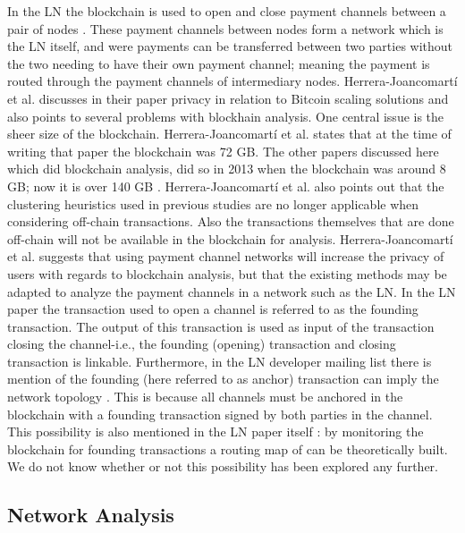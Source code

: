In the LN the blockchain is used to open and close payment channels between a pair of nodes \cite{poon2015bitcoin} \cite{malavolta2017concurrency}. These payment channels between nodes form a network which is the LN itself, and were payments can be transferred between two parties without the two needing to have their own payment channel; meaning the payment is routed through the payment channels of intermediary nodes.
Herrera-Joancomartí et al. discusses in their paper \cite{herrera2016privacy} privacy in relation to Bitcoin scaling solutions and also points to several problems with blockhain analysis. One central issue is the sheer size of the blockchain. Herrera-Joancomartí et al. states that at the time of writing that paper the blockchain was 72 GB. The other papers discussed here which did blockchain analysis, did so in 2013 when the blockchain was around 8 GB; now it is over 140 GB \cite{blockchain_size}. 
Herrera-Joancomartí et al. also points out that the clustering heuristics used in previous studies \cite{reid2013analysis}  \cite{meiklejohn2013fistful} are no longer applicable when considering off-chain transactions. Also the transactions themselves that are done off-chain will not be available in the blockchain for analysis. Herrera-Joancomartí et al. suggests that using payment channel networks will increase the privacy of users with regards to blockchain analysis, but that the existing methods may be adapted to analyze the payment channels in a network such as the LN. In the LN paper \cite{poon2015bitcoin} the transaction used to open a channel is referred to as the founding transaction. The output of this transaction is used as input of the transaction closing the channel-i.e., the founding (opening) transaction and closing transaction is linkable. Furthermore, in the LN developer mailing list there is mention of the founding (here referred to as anchor) transaction can imply the network topology \cite{rusty_routing1}. This is because all channels must be anchored in the blockchain with a founding transaction signed by both parties in the channel. This possibility is also mentioned in the LN paper itself \cite{poon2015bitcoin}: by monitoring the blockchain for founding transactions a routing map of can be theoretically built. We do not know whether or not this possibility has been explored any further.

\subsection{Network Analysis}

